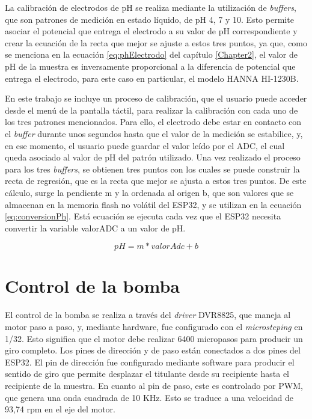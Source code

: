 La calibración de electrodos de pH se realiza mediante la utilización de \textit{buffers}, que son patrones de medición en estado líquido, de pH 4, 7 y 10. Esto permite asociar el potencial que entrega el electrodo a su valor de pH correspondiente y crear la ecuación de la recta que mejor se ajuste a estos tres puntos, ya que, como se menciona en la ecuación \ref{eq:phElectrodo} del capítulo \ref{Chapter2}, el valor de pH de la muestra es inversamente proporcional a la diferencia de potencial que entrega el electrodo, para este caso en particular, el modelo HANNA HI-1230B.

En este trabajo se incluye un proceso de calibración, que el usuario puede acceder desde el menú de la pantalla táctil, para realizar la calibración con cada uno de los tres patrones mencionados. Para ello, el electrodo debe estar en contacto con el \textit{buffer} durante unos segundos hasta que el valor de la medición se estabilice, y, en ese momento, el usuario puede guardar el valor leído por el ADC, el cual queda asociado al valor de pH del patrón utilizado. Una vez realizado el proceso para los tres \textit{buffers}, se obtienen tres puntos con los cuales se puede construir la recta de regresión, que es la recta que mejor se ajusta a estos tres puntos. De este cálculo, surge la pendiente m y la ordenada al origen b, que son valores que se almacenan en la memoria flash no volátil del ESP32, y se utilizan en la ecuación \ref{eq:conversionPh}. Está ecuación se ejecuta cada vez que el ESP32 necesita convertir la variable valorADC a un valor de pH.

\begin{equation}
	\label{eq:conversionPh}
pH = m * valorAdc + b
\end{equation}


\section{Control de la bomba}

El control de la bomba se realiza a través del \textit{driver} DVR8825, que maneja al motor paso a paso, y, mediante hardware, fue configurado con el \textit{microsteping} en 1/32. Esto significa que el motor debe realizar 6400 micropasos para producir un giro completo. Los pines de dirección y de paso están conectados a dos pines del ESP32. El pin de dirección fue configurado mediante software para producir el sentido de giro que permite desplazar el titulante desde su recipiente hasta el recipiente de la muestra. En cuanto al pin de paso, este es controlado por PWM, que genera una onda cuadrada de 10 KHz. Esto se traduce a una velocidad de 93,74 rpm en el eje del motor.

